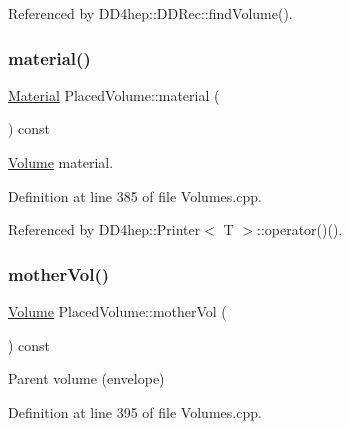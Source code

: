 Referenced by D\+D4hep\+::\+D\+D\+Rec\+::find\+Volume().

\hypertarget{class_d_d4hep_1_1_geometry_1_1_placed_volume_a0d8e672c9e72421f1c46a3419d6375e5}{}\label{class_d_d4hep_1_1_geometry_1_1_placed_volume_a0d8e672c9e72421f1c46a3419d6375e5} 
\subsubsection{\texorpdfstring{material()}{material()}}
{\footnotesize\ttfamily \hyperlink{class_d_d4hep_1_1_geometry_1_1_material}{Material} Placed\+Volume\+::material (\begin{DoxyParamCaption}{ }\end{DoxyParamCaption}) const}



\hyperlink{class_d_d4hep_1_1_geometry_1_1_volume}{Volume} material. 



Definition at line 385 of file Volumes.\+cpp.



Referenced by D\+D4hep\+::\+Printer$<$ T $>$\+::operator()().

\hypertarget{class_d_d4hep_1_1_geometry_1_1_placed_volume_aece40c15a283a40a857498be4a857103}{}\label{class_d_d4hep_1_1_geometry_1_1_placed_volume_aece40c15a283a40a857498be4a857103} 
\subsubsection{\texorpdfstring{mother\+Vol()}{motherVol()}}
{\footnotesize\ttfamily \hyperlink{class_d_d4hep_1_1_geometry_1_1_volume}{Volume} Placed\+Volume\+::mother\+Vol (\begin{DoxyParamCaption}{ }\end{DoxyParamCaption}) const}



Parent volume (envelope) 



Definition at line 395 of file Volumes.\+cpp.



